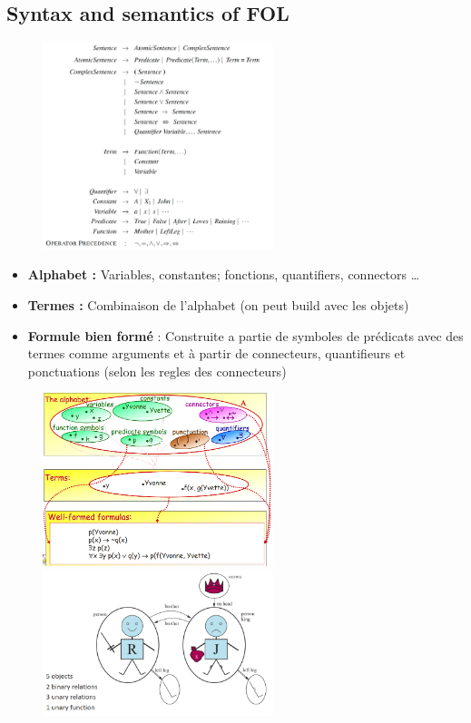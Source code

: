 	\subsection{Syntax and semantics of FOL}
		\begin{figure}[htp]	
			\centering
			\includegraphics[width=0.6\textwidth]{img/FOL.png}
		\end{figure}
		\begin{itemize}
			\item \textbf{Alphabet :} Variables, constantes; fonctions, quantifiers, connectors \dots
			\item \textbf{Termes :} Combinaison de l'alphabet (on peut build avec les objets)
			\item \textbf{Formule bien formé} : Construite a partie de symboles de prédicats avec des termes comme arguments et à partir de connecteurs, quantifieurs et ponctuations (selon les regles des connecteurs)
		\end{itemize}
		
		\begin{figure}[htp]	
			\centering
			\includegraphics[width=0.6\textwidth]{img/FOL1.png}
			\includegraphics[width=0.6\textwidth]{img/FOL2.png}

		\end{figure}
		
